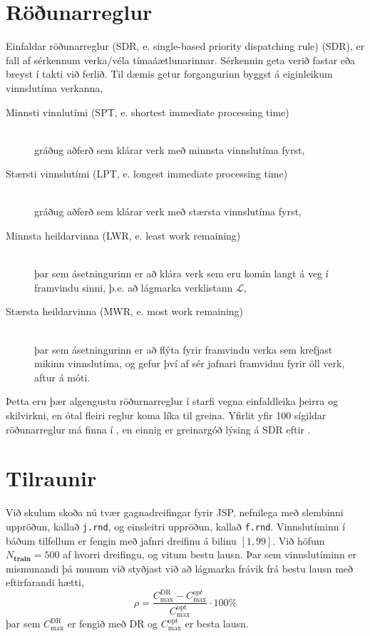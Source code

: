 \documentclass[]{article}
\begin{document}
\section{Röðunarreglur}
Einfaldar röðunarreglur (SDR, e. single-based priority dispatching rule) 
(SDR), er fall af sérkennum verka/véla tímaáætlunarinnar. Sérkennin geta verið 
fastar eða breyst í takti við ferlið. Til dæmis getur forgangurinn byggst á 
eiginleikum vinnslutíma verkanna, 
\begin{description}
    \item[Minnsti vinnlutími (SPT, e. shortest immediate processing time)] 
    \hfill \\ gráðug aðferð sem klárar verk með minnsta vinnslutíma fyrst, 
    \item[Stærsti vinnslutími (LPT, e. longest immediate processing time)] 
    \hfill \\ gráðug aðferð sem klárar verk með stærsta vinnslutíma fyrst, 
    \item[Minnsta heildarvinna (LWR, e. least work remaining)] \hfill \\
    þar sem ásetningurinn er að klára verk sem eru komin langt á veg í 
    framvindu sinni, þ.e. að lágmarka verklistann $\mathcal{L}$,
    \item[Stærsta heildarvinna (MWR, e. most work remaining)] \hfill \\
    þar sem ásetningurinn er að flýta fyrir framvindu verka sem krefjast mikinn 
    vinnslutíma, og gefur því af sér jafnari framvidnu fyrir öll verk, aftur á 
    móti.
\end{description}
Þetta eru þær algengustu röðurnarreglur í starfi vegna einfaldleika þeirra og 
skilvirkni, en ótal fleiri reglur koma líka til greina. Yfirlit yfir 100 
sígildar röðunarreglur má finna í \citet{Panwalkar77}, en einnig er greinargóð 
lýsing á SDR eftir \citet{Haupt89}. 

\section{Tilraunir}
Við skulum skoða nú tvær gagnadreifingar fyrir JSP, nefnilega með slembinni 
uppröðun, kallað \texttt{j.rnd}, og einsleitri uppröðun, kallað \texttt{f.rnd}. 
Vinnslutíminn í báðum tilfellum er fengin með jafnri dreifinu á bilinu $[1,99]$.
Við höfum $N_{\textbf{train}}=500$ af hvorri dreifingu, og vitum bestu lausn. 
Þar sem vinnslutíminn er mismunandi þá munum við styðjast við að lágmarka 
frávik frá bestu lausn með eftirfarandi hætti, 
\begin{equation}
\rho=\frac{C_{\max}^{\text{DR}}-C_{\max}^{opt}}{C_{\max}^{\text{opt}}}\cdot 
100\%
\end{equation}
þar sem $C_{\max}^{\text{DR}}$ er fengið með DR og $C_{\max}^{\text{opt}}$ er 
besta lausn. 
\end{document}
